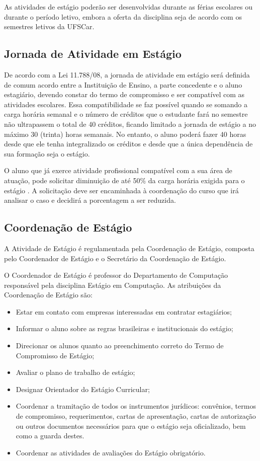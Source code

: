 As atividades de estágio poderão ser desenvolvidas durante as férias escolares ou durante o período letivo, embora a oferta da disciplina seja de acordo com os semestres letivos da UFSCar.


\subsection{Jornada de Atividade em Estágio}

De acordo com a Lei 11.788/08, a jornada de atividade em estágio será definida de comum acordo entre a Instituição de Ensino, a parte concedente e o aluno estagiário, devendo constar do termo de compromisso e ser compatível com as atividades escolares. Essa compatibilidade se faz possível quando se somando a carga horária semanal e o número de créditos que o estudante fará no semestre não ultrapassem o total de 40 créditos, ficando limitado a jornada de estágio a no máximo 30 (trinta) horas semanais. No entanto, o aluno poderá fazer 40 horas desde que ele tenha integralizado os créditos e desde que a única dependência de sua formação seja o estágio.

O aluno que já exerce atividade profissional compatível com a sua área de atuação, pode solicitar diminuição de até 50\% da carga horária exigida para o estágio \cite{Regimento-Geral-CursosGraduacao-UFSCar}. A solicitação deve ser encaminhada à coordenação do curso que irá analisar o caso e decidirá a porcentagem a ser reduzida.  


\subsection{Coordenação de Estágio}
A Atividade de Estágio é regulamentada pela Coordenação de Estágio, composta pelo Coordenador de Estágio e o Secretário da Coordenação de Estágio.

O Coordenador de Estágio é professor do Departamento de Computação responsável pela disciplina Estágio em Computação.
As atribuições da Coordenação de Estágio são:

\begin{itemize}
\item Estar em contato com empresas interessadas em contratar estagiários;
\item Informar o aluno sobre as regras brasileiras e institucionais do estágio;
\item Direcionar os alunos quanto ao preenchimento correto do Termo de Compromisso de Estágio;
\item  Avaliar o plano de trabalho de estágio;
\item  Designar Orientador do Estágio Curricular;
\item  Coordenar a tramitação de todos os instrumentos jurídicos: convênios, termos de compromisso, requerimentos, cartas de apresentação, cartas de autorização ou outros documentos necessários para que o estágio seja oficializado, bem como a guarda destes.
\item  Coordenar as atividades de avaliações do Estágio obrigatório.
\end{itemize}

